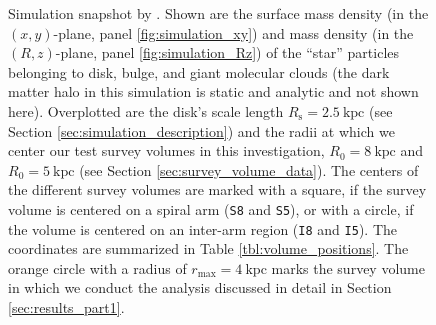\documentclass[iop,revtex4,numberedappendix,appendixfloats]{emulateapj}
\begin{document}
\begin{figure}[!htbp]
\caption{Simulation snapshot by \citet{2013ApJ...766...34D}. Shown are the surface mass density (in the $(x,y)$-plane, panel \ref{fig:simulation_xy}) and mass density (in the $(R,z)$-plane, panel \ref{fig:simulation_Rz}) of the ``star'' particles belonging to disk, bulge, and giant molecular clouds (the dark matter halo in this simulation is static and analytic and not shown here). Overplotted are the disk's scale length $R_\text{s}=2.5~\text{kpc}$ (see Section \ref{sec:simulation_description}) and the radii at which we center our test survey volumes in this investigation, $R_0=8~\text{kpc}$ and $R_0 = 5~\text{kpc}$ (see Section \ref{sec:survey_volume_data}). The centers of the different survey volumes are marked with a square, if the survey volume is centered on a spiral arm (\texttt{S8} and \texttt{\texttt{S5}}), or with a circle, if the volume is centered on an inter-arm region (\texttt{I8} and \texttt{\texttt{I5}}). The coordinates are summarized in Table \ref{tbl:volume_positions}. The orange circle with a radius of $r_\text{max}=4~\text{kpc}$ marks the survey volume in which we conduct the analysis discussed in detail in Section \ref{sec:results_part1}.}

\end{figure}
\end{document}

